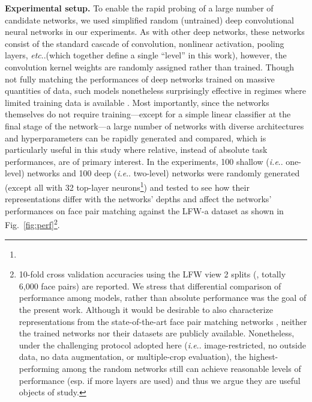 \documentclass[fleqn]{article} %
\makeatletter
\DeclareRobustCommand\onedot{\futurelet\@let@token\@onedot}
\def\@onedot{\ifx\@let@token.\else.\null\fi\xspace}
\def\eg{\emph{e.g}\onedot} \def\Eg{\emph{E.g}\onedot}
\def\ie{\emph{i.e}\onedot} \def\Ie{\emph{I.e}\onedot}
\def\etc{\emph{etc}\onedot} \def\vs{\emph{vs}\onedot}
\makeatother
\begin{document}
\newcommand{\expperf}{10-fold cross validation accuracies using the LFW view 2 splits (\cite{LFWTech}, totally 6,000 face pairs) are reported.
We stress that differential comparison of performance among models, rather than absolute performance was the goal of the present work.
Although it would be desirable to also characterize representations from the state-of-the-art face pair matching networks \cite{taigman2014deepface, sun2014deep, schroff2015facenet}, neither the trained networks nor their datasets are publicly available.
Nonetheless, under the challenging protocol adopted here (\ie image-restricted, no outside data, no data augmentation, or multiple-crop evaluation), the highest-performing among the random networks still can achieve reasonable levels of performance (esp. if more layers are used) and thus we argue they are useful objects of study. 
} 

{\bf Experimental setup.}
To enable the rapid probing of a large number of candidate networks, we used simplified random (untrained) deep convolutional neural networks \cite{cox2011beyond, sthor} in our experiments.
As with other deep networks, these networks consist of the standard cascade of convolution, nonlinear activation, pooling layers, \etc (which together define a single ``level'' in this work), however, the convolution kernel weights are randomly assigned rather than trained.
Though not fully matching the performances of deep networks trained on massive quantities of data, such models nonetheless surprisingly effective in regimes where limited training data is available \cite{cox2011beyond}. %
Most importantly, since the networks themselves do not require training---except for a simple linear classifier at the final stage of the network---a large number of networks with diverse architectures and hyperparameters can be rapidly generated and compared, which is particularly useful in this study where relative, instead of absolute task performances, are of primary interest.
In the experiments, 100 shallow (\ie one-level) networks and 100 deep (\ie two-level) networks {were} randomly generated (except all with 32 top-layer neurons\footnote{\expsettings}) and tested to see how their representations differ with the networks' depths and affect the networks' performances on face pair matching against the LFW-a dataset \cite{wolf2011effective} as shown in Fig.~\ref{fig:perf}\footnote{\expperf}.
\end{document}
